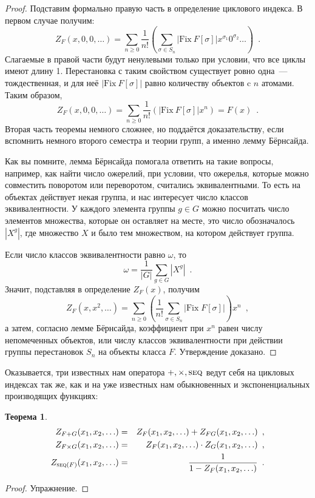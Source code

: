 \documentclass{article}
\def \seq {\text{\textsc{seq}}}
\theoremstyle{definition}
\newtheorem*{theorem}{Теорема}
\begin{document}
\begin{proof}
    Подставим формально правую часть в определение циклового индекса. В первом случае получим:
	\[
		Z_F(x, 0, 0, \ldots) = \sum_{n \geq 0} \dfrac{1}{n!} \left(
			\sum_{\sigma \in S_n} |\mathrm{Fix}\ F[\sigma]|x^{\sigma_1} 
			0^{\sigma_2} \ldots
		\right) \enspace .
	\]
    Слагаемые в правой части будут ненулевыми только при условии, что все циклы имеют длину 1.
Перестановка с таким свойством существует ровно одна~--- тождественная, и для
неё \( |\mathrm{Fix}\ F[\sigma]| \) равно количеству объектов c \( n \) атомами. 
Таким образом,  
	\[
		Z_F(x, 0, 0, \ldots) = \sum_{n \geq 0} \dfrac{1}{n!} \left(
			 |\mathrm{Fix}\ F[\sigma]| x^n
            \right) = F(x) \enspace .
	\]
Вторая часть теоремы немного сложнее, но поддаётся доказательству, если
вспомнить немного второго семестра и теории групп, а именно лемму Бёрнсайда.

Как вы помните, лемма Бёрнсайда помогала ответить на такие вопросы, например,
как найти число ожерелий, при условии, что ожерелья, которые можно совместить
поворотом или переворотом, считались эквивалентными. То есть на объектах
действует некая группа, и нас интересует число классов эквивалентности. У
каждого элемента группы \( g \in G \) можно посчитать число элементов множества,
которые он оставляет на месте, это число обозначалось \( |X^g| \), где множество
\( X \) и было тем множеством, на котором действует группа.

Если число классов эквивалентности равно \( \omega \), то 
\[
	\omega = \dfrac{1}{|G|} \sum_{g \in G} |X^g| \enspace .
\]
Значит, подставляя в определение \( Z_F(x) \), получим
\[
	Z_F(x, x^2, \ldots) = \sum_{n \geq 0} \left(\dfrac{1}{n!} 
		\sum_{\sigma \in S_n} |\mathrm{Fix} \; F[\sigma]|
	\right) x^n \enspace ,
\]
а затем, согласно лемме Бёрнсайда, коэффициент при \( x^n \) равен числу
непомеченных объектов, или числу классов эквивалентности при действии группы
перестановок \( S_n  \) на объекты класса \( F \). Утверждение доказано.
\end{proof}




Оказывается, три известных нам оператора \( +, \times, \seq \) ведут себя на
цикловых индексах так же, как и на уже известных нам обыкновенных и
экспоненциальных производящих функциях:
\begin{theorem}
	\begin{eqnarray*}
		Z_{F + G}(x_1, x_2, \ldots) &=& Z_{F}(x_1, x_2, \ldots) + Z_{FG}(x_1, x_2, \ldots) \enspace , \\
		Z_{F \times G}(x_1, x_2, \ldots) &=& Z_{F}(x_1, x_2, \ldots) \cdot Z_{G}(x_1, x_2, \ldots) \enspace , \\
		Z_{\seq(F)}(x_1, x_2, \ldots) &=& \dfrac{1}{1 - Z_{F}(x_1, x_2, \ldots)} \enspace .
	\end{eqnarray*}
\end{theorem}
\begin{proof}
	Упражнение.
\end{proof}
\end{document}
